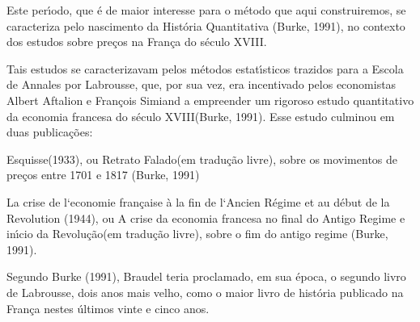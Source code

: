 \documentclass[
12pt,		%
openright,	%
twoside,  %
a4paper,			%
chapter=TITLE,		%
english,			%
french,				%
spanish,			%
brazil				%
]{USPSC-classe/USPSC}
\begin{document}
Este per\'{\i}odo, que \'e de maior interesse para o m\'etodo que aqui construiremos, se caracteriza pelo nascimento da Hist\'oria Quantitativa (Burke, 1991), no contexto dos estudos sobre pre\c{c}os na Fran\c{c}a do s\'eculo XVIII.

















Tais estudos se caracterizavam pelos m\'etodos estat\'{\i}sticos trazidos para a Escola de Annales por Labrousse, que, por sua vez, era \textquotedbl incentivado pelos economistas Albert Aftalion e Fran\c{c}ois Simiand a empreender um rigoroso estudo quantitativo da economia francesa do s\'eculo XVIII\textquotedbl   (Burke, 1991). Esse estudo culminou em duas publica\c{c}\~oes:


















\begin{alineas}
\item \textquotedbl Esquisse\textquotedbl  (1933), ou \textquotedbl Retrato Falado\textquotedbl  (em tradu\c{c}\~ao livre), sobre os movimentos de pre\c{c}os entre 1701 e 1817  (Burke, 1991)
\item La crise de l`economie fran\c{c}aise \`a la fin de l`Ancien R\'egime et au d\'ebut de la Revolution (1944), ou \textquotedbl A crise da economia francesa no final do Antigo Regime e in\'{\i}cio da Revolu\c{c}\~ao\textquotedbl  (em tradu\c{c}\~ao livre), sobre o fim do antigo regime  (Burke, 1991).
\end{alineas}

Segundo  Burke (1991), Braudel teria proclamado, em sua \'epoca, o segundo livro de Labrousse, dois anos mais velho, como \textquotedbl o maior livro de hist\'oria publicado na Fran\c{c}a nestes \'ultimos vinte e cinco anos\textquotedbl .
\end{document}
